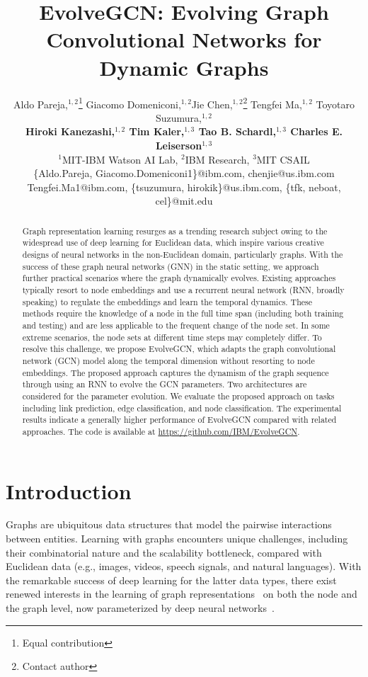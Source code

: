 \documentclass[letterpaper]{article} %
\title{EvolveGCN: Evolving Graph Convolutional Networks for Dynamic Graphs}
\author{
Aldo Pareja,$^{1,2}$\thanks{Equal contribution}
Giacomo Domeniconi,$^{1,2}$\footnotemark[1]
Jie Chen,$^{1,2}$\thanks{Contact author}
Tengfei Ma,$^{1,2}$
Toyotaro Suzumura,$^{1,2}$\\
\Large \textbf{%
Hiroki Kanezashi,$^{1,2}$
Tim Kaler,$^{1,3}$
Tao B. Schardl,$^{1,3}$
Charles E. Leiserson$^{1,3}$}\\
$^1$MIT-IBM Watson AI Lab,
$^2$IBM Research,
$^3$MIT CSAIL\\
\{Aldo.Pareja, Giacomo.Domeniconi1\}@ibm.com, chenjie@us.ibm.com\\
Tengfei.Ma1@ibm.com, \{tsuzumura, hirokik\}@us.ibm.com,
\{tfk, neboat, cel\}@mit.edu
}
\begin{document}
\maketitle


\begin{abstract}
  Graph representation learning resurges as a trending research subject owing to the widespread use of deep learning for Euclidean data, which inspire various creative designs of neural networks in the non-Euclidean domain, particularly graphs. With the success of these graph neural networks (GNN) in the static setting, we approach further practical scenarios where the graph dynamically evolves. Existing approaches typically resort to node embeddings and use a recurrent neural network (RNN, broadly speaking) to regulate the embeddings and learn the temporal dynamics. These methods require the knowledge of a node in the full time span (including both training and testing) and are less applicable to the frequent change of the node set. In some extreme scenarios, the node sets at different time steps may completely differ. To resolve this challenge, we propose EvolveGCN, which adapts the graph convolutional network (GCN) model along the temporal dimension without resorting to node embeddings. The proposed approach captures the dynamism of the graph sequence through using an RNN to evolve the GCN parameters. Two architectures are considered for the parameter evolution. We evaluate the proposed approach on tasks including link prediction, edge classification, and node classification. The experimental results indicate a generally higher performance of EvolveGCN compared with related approaches. The code is available at \url{https://github.com/IBM/EvolveGCN}.
\end{abstract}


\section{Introduction}
Graphs are ubiquitous data structures that model the pairwise interactions between entities. Learning with graphs encounters unique challenges, including their combinatorial nature and the scalability bottleneck, compared with Euclidean data (e.g., images, videos, speech signals, and natural languages). With the remarkable success of deep learning for the latter data types, there exist renewed interests in the learning of graph representations~\cite{Perozzi2014,Tang2015,Cao2015,Ou2016,Grover2016} on both the node and the graph level, now parameterized by deep neural networks~\cite{Bruna2014,Duvenaud2015,Defferrard2016,Li2016,Gilmer2017,Kipf2017,Hamilton2017,Jin2017,Chen2018,Velickovic2018,Gao2019}.
\end{document}
